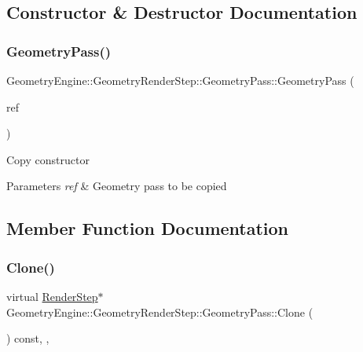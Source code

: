 \subsection{Constructor \& Destructor Documentation}
\mbox{\label{class_geometry_engine_1_1_geometry_render_step_1_1_geometry_pass_a4c587bb12a23da23a1617824ccca402d}} 
\subsubsection{\texorpdfstring{GeometryPass()}{GeometryPass()}}
{\footnotesize\ttfamily Geometry\+Engine\+::\+Geometry\+Render\+Step\+::\+Geometry\+Pass\+::\+Geometry\+Pass (\begin{DoxyParamCaption}\item[{const \mbox{\hyperlink{class_geometry_engine_1_1_geometry_render_step_1_1_geometry_pass}{Geometry\+Pass}} \&}]{ref }\end{DoxyParamCaption})\hspace{0.3cm}{\ttfamily [inline]}}

Copy constructor 
\begin{DoxyParams}{Parameters}
{\em ref} & Geometry pass to be copied \\
\hline
\end{DoxyParams}


\subsection{Member Function Documentation}
\mbox{\label{class_geometry_engine_1_1_geometry_render_step_1_1_geometry_pass_a12e85a0169cb7b92cb8bd7b7fe100b33}} 
\subsubsection{\texorpdfstring{Clone()}{Clone()}}
{\footnotesize\ttfamily virtual \mbox{\hyperlink{class_geometry_engine_1_1_geometry_render_step_1_1_render_step}{Render\+Step}}$\ast$ Geometry\+Engine\+::\+Geometry\+Render\+Step\+::\+Geometry\+Pass\+::\+Clone (\begin{DoxyParamCaption}{ }\end{DoxyParamCaption}) const\hspace{0.3cm}{\ttfamily [inline]}, {\ttfamily [override]}, {\ttfamily [virtual]}}

